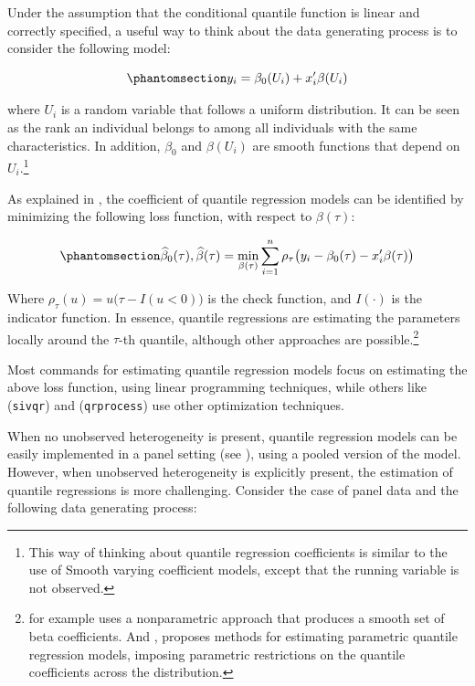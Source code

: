 \documentclass[bib]{statapress}
\begin{document}
Under the assumption that the conditional quantile function is linear
and correctly specified, a useful way to think about the data generating
process is to consider the following model:

\begin{equation}\phantomsection\label{eq-dgp}{y_i = \beta_0(U_i)+x_i'\beta(U_i) 
}\end{equation}

where \(U_i\) is a random variable that follows a uniform distribution.
It can be seen as the rank an individual belongs to among all
individuals with the same characteristics. In addition, \(\beta_0\) and
\(\beta(U_i)\) are smooth functions that depend on \(U_i\).\footnote{This
  way of thinking about quantile regression coefficients is similar to
  the use of Smooth varying coefficient models, except that the running
  variable is not observed.}

As explained in \citet{wooldridge2010}, the coefficient of quantile
regression models can be identified by minimizing the following loss
function, with respect to \(\beta(\tau)\):

\begin{equation}\phantomsection\label{eq-qloss}{
\hat\beta_0(\tau),\hat\beta(\tau) = \min_{\beta(\tau)} \sum_{i=1}^{n} \rho_\tau \big(y_i-\beta_0(\tau)-x_i'\beta(\tau)\big)
}\end{equation}

Where \(\rho_\tau(u)=u\big(\tau-I(u<0)\big)\) is the check function, and
\(I(\cdot)\) is the indicator function. In essence, quantile regressions
are estimating the parameters locally around the \(\tau\)-th quantile,
although other approaches are possible.\footnote{\citet{kaplan2017} for
  example uses a nonparametric approach that produces a smooth set of
  beta coefficients. And \citet{bottai2019}, proposes methods for
  estimating parametric quantile regression models, imposing parametric
  restrictions on the quantile coefficients across the distribution.}

Most commands for estimating quantile regression models focus on
estimating the above loss function, using linear programming techniques,
while others like \citet{kaplan2017} (\texttt{sivqr}) and
\citet{chernozhukov2022} (\texttt{qrprocess}) use other optimization
techniques.

When no unobserved heterogeneity is present, quantile regression models
can be easily implemented in a panel setting (see
\citet{wooldridge2010}), using a pooled version of the model. However,
when unobserved heterogeneity is explicitly present, the estimation of
quantile regressions is more challenging. Consider the case of panel
data and the following data generating process:
\end{document}
